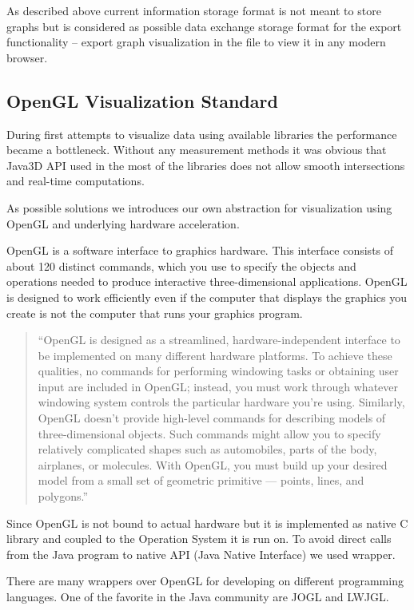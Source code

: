 As described above current information storage format is not meant to store graphs but is considered as possible data exchange storage format for the export functionality -- export graph visualization in the file to view it in any modern browser.

\subsection{OpenGL Visualization Standard}
\label{sec:opengl}
During first attempts to visualize data using available libraries the performance became a bottleneck. Without any measurement methods it was obvious that Java3D API used in the most of the libraries does not allow smooth intersections and real-time computations.


As possible solutions we introduces our own abstraction for visualization using OpenGL and underlying hardware acceleration.


OpenGL is a software interface to graphics hardware. This interface consists of about 120 distinct commands,
which you use to specify the objects and operations needed to produce interactive three-dimensional applications.
OpenGL is designed to work efficiently even if the computer that displays the graphics you create is not the computer that runs your graphics program.

\begin{quotation}
``OpenGL is designed as a streamlined, hardware-independent interface to be implemented on many different hardware platforms.
To achieve these qualities, no commands for performing windowing tasks or obtaining user input are included in OpenGL;
instead, you must work through whatever windowing system controls the particular hardware you're using.
Similarly, OpenGL doesn't provide high-level commands for describing models of three-dimensional objects.
Such commands might allow you to specify relatively complicated shapes such as automobiles, parts of the body, airplanes,
or molecules. With OpenGL, you must build up your desired model from a small set of geometric primitive --- points,
lines, and polygons.''~\cite{THE_RED_BOOK}
\end{quotation}

Since OpenGL is not bound to actual hardware but it is implemented as native C library and coupled to the Operation System it is run on. To avoid direct calls from the Java program to native API (Java Native Interface) we used wrapper.

There are many wrappers over OpenGL for developing on different programming languages.
One of the favorite in the Java community are JOGL and LWJGL.

